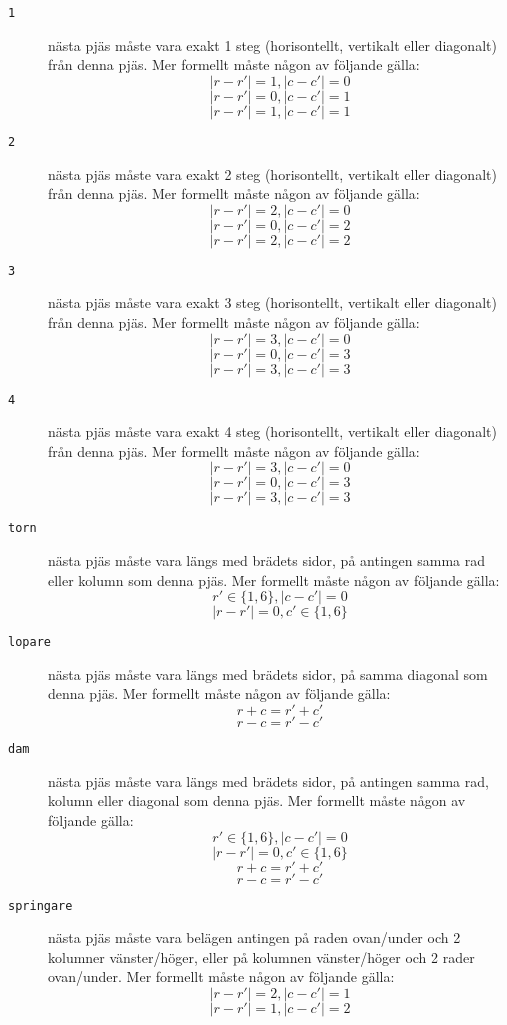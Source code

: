 \begin{description}
	\item[\texttt{1}] nästa pjäs måste vara exakt 1 steg (horisontellt, vertikalt eller diagonalt) från denna pjäs.
		Mer formellt måste någon av följande gälla:
		$$|r - r'| = 1, |c - c'| = 0$$
		$$|r - r'| = 0, |c - c'| = 1$$
		$$|r - r'| = 1, |c - c'| = 1$$

	\item[\texttt{2}] nästa pjäs måste vara exakt 2 steg (horisontellt, vertikalt eller diagonalt) från denna pjäs.
		Mer formellt måste någon av följande gälla:
		$$|r - r'| = 2, |c - c'| = 0$$
		$$|r - r'| = 0, |c - c'| = 2$$
		$$|r - r'| = 2, |c - c'| = 2$$

	\item[\texttt{3}] nästa pjäs måste vara exakt 3 steg (horisontellt, vertikalt eller diagonalt) från denna pjäs.
		Mer formellt måste någon av följande gälla:
		$$|r - r'| = 3, |c - c'| = 0$$
		$$|r - r'| = 0, |c - c'| = 3$$
		$$|r - r'| = 3, |c - c'| = 3$$

	\item[\texttt{4}] nästa pjäs måste vara exakt 4 steg (horisontellt, vertikalt eller diagonalt) från denna pjäs.
		Mer formellt måste någon av följande gälla:
		$$|r - r'| = 3, |c - c'| = 0$$
		$$|r - r'| = 0, |c - c'| = 3$$
		$$|r - r'| = 3, |c - c'| = 3$$

	\item[\texttt{torn}] nästa pjäs måste vara längs med brädets sidor, på antingen samma rad eller kolumn som denna pjäs.
		Mer formellt måste någon av följande gälla:
		$$r' \in \{1, 6\}, |c - c'| = 0$$
		$$|r - r'| = 0, c' \in \{1, 6\}$$

	\item[\texttt{lopare}] nästa pjäs måste vara längs med brädets sidor, på samma diagonal som denna pjäs.
		Mer formellt måste någon av följande gälla:
		$$r + c = r' + c'$$
		$$r - c = r' - c'$$

	\item[\texttt{dam}] nästa pjäs måste vara längs med brädets sidor, på antingen samma rad, kolumn eller diagonal som denna pjäs.
		Mer formellt måste någon av följande gälla:
		$$r' \in \{1, 6\}, |c - c'| = 0$$
		$$|r - r'| = 0, c' \in \{1, 6\}$$
		$$r + c = r' + c'$$
		$$r - c = r' - c'$$

	\item[\texttt{springare}] nästa pjäs måste vara belägen antingen på raden ovan/under och 2 kolumner vänster/höger, eller
		på kolumnen vänster/höger och 2 rader ovan/under.
		Mer formellt måste någon av följande gälla:
		$$|r - r'| = 2, |c - c'| = 1$$
		$$|r - r'| = 1, |c - c'| = 2$$
\end{description}

